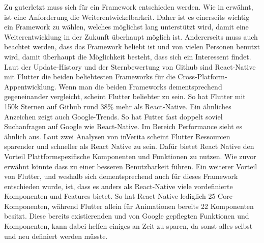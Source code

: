 \myNewSection
Zu guterletzt muss sich für ein Framework entschieden werden.\newline
	Wie in  erwähnt, ist eine Anforderung die Weiterentwickelbarkeit. Daher ist es einerseits wichtig ein Framework zu wählen, welches möglichst lang unterstützt wird, damit eine Weiterentwicklung in der Zukunft überhaupt möglich ist.\newline
	Andererseits muss auch beachtet werden, dass das Framework beliebt ist und von vielen Personen benutzt wird, damit überhaupt die Möglichkeit besteht, dass sich ein Interessent findet.\newline
	Laut der Update-History und der Sternbewertung von Github sind React-Native mit Flutter die beiden beliebtesten Frameworks für die Cross-Platform-Appentwicklung\cite{tech_flutterStars, tech_reactNativStars}.\newline
Wenn man die beiden Frameworks dementsprechend gegeneinander vergleicht, scheint Flutter beliebter zu sein. So hat Flutter mit 150k Sternen auf Github rund 38\% mehr als React-Native\cite{tech_flutterStars, tech_reactNativStars}. Ein ähnliches Anzeichen zeigt auch Google-Trends. So hat Futter fast doppelt soviel Suchanfragen auf Google wie React-Native\cite{tech_googleTrendsFlutterVsReactNative}.\newline
Im Bereich Performance sieht es ähnlich aus. Laut zwei Analysen von inVerita scheint Flutter Ressourcen sparender und schneller als React Native zu sein\cite{tech_performanceReactNativeVsFlutter1, tech_performanceReactNativeVsFlutter2}.\newline
Dafür bietet React Native den Vorteil Plattformspezifische Komponenten und Funktionen zu nutzen. Wie zuvor erwähnt könnte dass zu einer besseren Benutzbarkeit führen.\newline
Ein weiterer Vorteil von Flutter, und weshalb sich dementsprechend auch für dieses Framework entschieden wurde, ist, dass es anders als React-Native viele vordefinierte Komponenten und Features bietet. So hat React-Native lediglich 25 Core-Komponenten, während Flutter allein für Animationen bereits 22 Komponenten besitzt\cite{tech_componentsFlutter, tech_componentsReactNative}.  Diese bereits existierenden und von Google gepflegten Funktionen und Komponenten, kann dabei helfen einiges an Zeit zu sparen, da sonst alles selbst und neu definiert werden müsste.